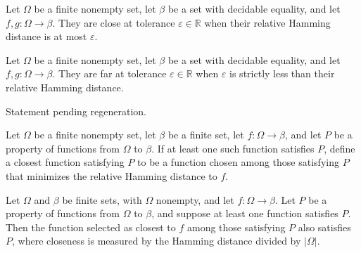 \begin{definition}
\label{FABL.IsClose}
\leanok
{}
Let $\Omega$ be a finite nonempty set, let $\beta$ be a set with decidable equality, and
let $f,g:\Omega\to\beta$. They are close at tolerance $\varepsilon\in\mathbb{R}$ when
their relative Hamming distance is at most $\varepsilon$.
\end{definition}

\begin{definition}
\label{FABL.IsFar}
\leanok
{}
Let $\Omega$ be a finite nonempty set, let $\beta$ be a set with decidable equality, and
let $f,g:\Omega\to\beta$. They are far at tolerance $\varepsilon\in\mathbb{R}$ when
$\varepsilon$ is strictly less than their relative Hamming distance.
\end{definition}

\begin{theorem}
\label{FABL.exists_closestInProperty}
\leanok
{}
Statement pending regeneration.
\end{theorem}

\begin{definition}
\label{FABL.closestInProperty}
\leanok
{}
Let $\Omega$ be a finite nonempty set, let $\beta$ be a finite set, let
$f:\Omega\to\beta$, and let $P$ be a property of functions from $\Omega$ to $\beta$. If
at least one such function satisfies $P$, define a closest function satisfying $P$ to be
a function chosen among those satisfying $P$ that minimizes the relative Hamming
distance to $f$.
\end{definition}

\begin{theorem}
\label{FABL.closestInProperty_mem}
\leanok
{}
Let $\Omega$ and $\beta$ be finite sets, with $\Omega$ nonempty, and let
$f\colon\Omega\to\beta$. Let $P$ be a property of functions from $\Omega$ to $\beta$,
and suppose at least one function satisfies $P$. Then the function selected as closest
to $f$ among those satisfying $P$ also satisfies $P$, where closeness is measured by the
Hamming distance divided by $|\Omega|$.
\end{theorem}

